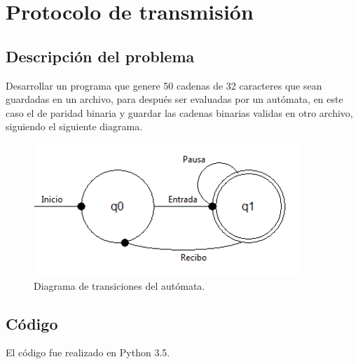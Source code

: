 \section{Protocolo de transmisión}
	\subsection{Descripción del problema}
	Desarrollar un programa que genere 50 cadenas de 32 caracteres que sean guardadas en un archivo, para después ser evaluadas por un autómata, en este caso el de paridad binaria y guardar las cadenas binarias validas en otro archivo, siguiendo el siguiente diagrama.
	\begin{figure}[H]
		\begin{center}
			\includegraphics[width=10cm, height=5cm]{img/protocolo.png}
			\caption{Diagrama de transiciones del autómata. \cite{WEB}}
			\label{fig:diagrama3}
		\end{center}
	\end{figure}
	\subsection{Código}
	El código fue realizado en Python 3.5.

